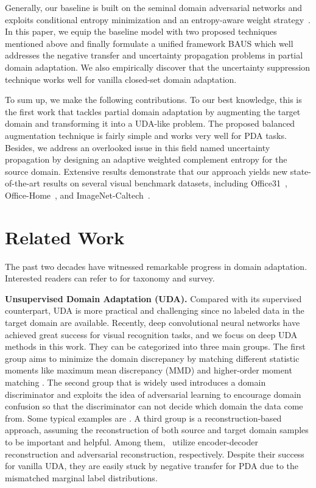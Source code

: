 \documentclass[runningheads]{llncs}
\begin{document}
Generally, our baseline is built on the seminal domain adversarial networks \cite{ganin2015unsupervised,ganin2016domain} and exploits conditional entropy minimization and an entropy-aware weight strategy~\cite{long2018conditional}.
In this paper, we equip the baseline model with two proposed techniques mentioned above and finally formulate a unified framework BAUS which well addresses the negative transfer and uncertainty propagation problems in partial domain adaptation.
We also empirically discover that the uncertainty suppression technique works well for vanilla closed-set domain adaptation.


To sum up, we make the following contributions. To our best knowledge, this is the first work that tackles partial domain adaptation by augmenting the target domain and transforming it into a UDA-like problem. 
The proposed balanced augmentation technique is fairly simple and works very well for PDA tasks.
Besides, we address an overlooked issue in this field named uncertainty propagation by designing an adaptive weighted complement entropy for the source domain.
Extensive results demonstrate that our approach yields new state-of-the-art results on several visual benchmark datasets, including Office31~\cite{saenko2010adapting}, Office-Home~\cite{venkateswara2017deep}, and ImageNet-Caltech~\cite{cao2019learning}.


\section{Related Work}
The past two decades have witnessed remarkable progress in domain adaptation. Interested readers can refer to \cite{csurka2017domain,zhang2019transfer,kouw2019review} for taxonomy and survey. 


\textbf{Unsupervised Domain Adaptation (UDA).} 
Compared with its supervised counterpart, UDA is more practical and challenging since no labeled data in the target domain are available. 
Recently, deep convolutional neural networks have achieved great success for visual recognition tasks, and we focus on deep UDA methods in this work. They can be categorized into three main groups.
The first group aims to minimize the domain discrepancy by matching different statistic moments like maximum mean discrepancy (MMD) \cite{tzeng2014deep,long2015learning,long2017deep,liang2019aggregating} and higher-order moment matching \cite{sun2016deep,zellinger2016central,koniusz2017domain}.
The second group that is widely used introduces a domain discriminator and exploits the idea of adversarial learning \cite{goodfellow2014generative} to encourage domain confusion so that the discriminator can not decide which domain the data come from. 
Some typical examples are \cite{tzeng2015simultaneous,ganin2016domain,tzeng2017adversarial,bousmalis2017unsupervised}.
A third group is a reconstruction-based approach, assuming the reconstruction of both source and target domain samples to be important and helpful. Among them,~\cite{ghifary2016deep,zhu2017unpaired} utilize encoder-decoder reconstruction and adversarial reconstruction, respectively. 
Despite their success for vanilla UDA, they are easily stuck by negative transfer for PDA due to the mismatched marginal label distributions. 
\end{document}
